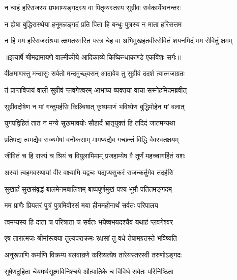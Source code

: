 \twolineshloka
{न चाहं हरिराजस्य प्रभवाम्यङ्गदस्य वा}
{पितृव्यस्तस्य सुग्रीवः सर्वकार्येष्वनन्तरः} %

\twolineshloka
{न ह्येषा बुद्धिरास्थेया हनूमन्नङ्गदं प्रति}
{पिता हि बन्धुः पुत्रस्य न माता हरिसत्तम} %

\fourlineindentedshloka
{न हि मम हरिराजसंश्रया}
{त्क्षमतरमस्ति परत्र चेह वा}
{अभिमुखहतवीरसेवितं}
{ शयनमिदं मम सेवितुं क्षमम्} %


{॥इत्यार्षे श्रीमद्रामायणे वाल्मीकीये आदिकाव्ये किष्किन्धाकाण्डे एकविंशः सर्गः॥}


\twolineshloka
{वीक्षमाणस्तु मन्दासुः सर्वतो मन्दमुच्छ्वसन्}
{आदावेव तु सुग्रीवं ददर्श त्वात्मजाग्रतः} %

\twolineshloka
{तं प्राप्तविजयं वाली सुग्रीवं प्लवगेश्वरम्}
{आभाष्य व्यक्तया वाचा सस्नेहमिदमब्रवीत्} %

\twolineshloka
{सुग्रीवदोषेण न मां गन्तुमर्हसि किल्बिषात्}
{कृष्यमाणं भविष्येण बुद्धिमोहेन मां बलात्} %

\twolineshloka
{युगपद्विहितं तात न मन्ये सुखमावयोः}
{सौहार्दं भ्रातृयुक्तं हि तदिदं जातमन्यथा} %

\twolineshloka
{प्रतिपद्य त्वमद्यैव राज्यमेषां वनौकसाम्}
{मामप्यद्यैव गच्छन्तं विद्धि वैवस्वतक्षयम्} %

\twolineshloka
{जीवितं च हि राज्यं च श्रियं च विपुलामिमाम्}
{प्रजहाम्येष वै तूर्णं महच्चागर्हितं यशः} %

\twolineshloka
{अस्यां त्वहमवस्थायां वीर वक्ष्यामि यद्वचः}
{यद्यप्यसुकरं राजन्कर्तुमेव तदर्हसि} %

\twolineshloka
{सुखार्हं सुखसंवृद्धं बालमेनमबालिशम्}
{बाष्पपूर्णमुखं पश्य भूमौ पतितमङ्गदम्} %

\twolineshloka
{मम प्राणैः प्रियतरं पुत्रं पुत्रमिवौरसं}
{मया हीनमहीनार्थं सर्वतः परिपालय} %

\twolineshloka
{त्वमप्यस्य हि दाता च परित्राता च सर्वतः}
{भयेष्वभयदश्चैव यथाहं प्लवगेश्वर} %

\twolineshloka
{एष तारात्मजः श्रीमांस्त्वया तुल्यपराक्रमः}
{रक्षसां तु वधे तेषामग्रतस्ते भविष्यति} %

\twolineshloka
{अनुरूपाणि कर्माणि विक्रम्य बलवान्रणे}
{करिष्यत्येष तारेयस्तरस्वी तरुणोऽङ्गदः} %

\twolineshloka
{सुषेणदुहिता चेयमर्थसूक्ष्मविनिश्चये}
{औत्पातिके च विविधे सर्वतः परिनिष्ठिता} %

